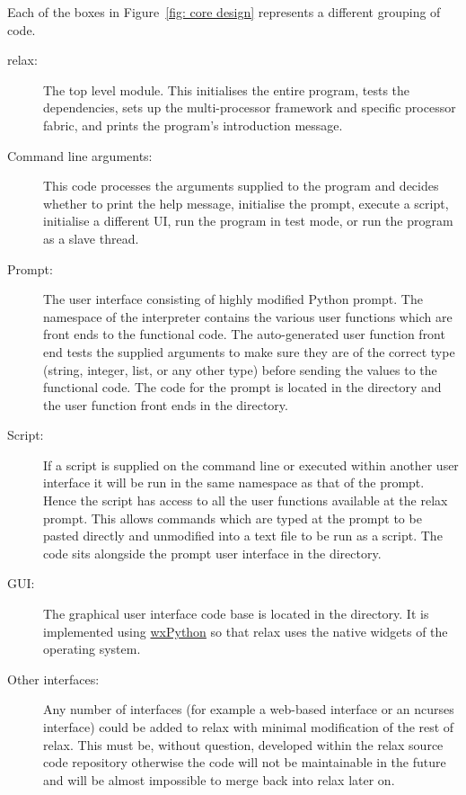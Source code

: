Each of the boxes in Figure~\ref{fig: core design} represents a different grouping of code.
\begin{description}
  \item[relax:]  The top level module.
    This initialises the entire program, tests the dependencies, sets up the multi-processor framework and specific processor fabric, and prints the program's introduction message.
  \item[Command line arguments:]  This code processes the arguments supplied to the program and decides whether to print the help message, initialise the prompt, execute a script, initialise a different UI, run the program in test mode, or run the program as a slave thread.
  \item[Prompt:]  The user interface consisting of highly modified Python prompt.
    The namespace of the interpreter contains the various user functions which are front ends to the functional code.
    The auto-generated user function front end tests the supplied arguments to make sure they are of the correct type (string, integer, list, or any other type) before sending the values to the functional code.
    The code for the prompt is located in the  directory and the user function front ends in the  directory.
  \item[Script:]  If a script is supplied on the command line or executed within another user interface it will be run in the same namespace as that of the prompt.
    Hence the script has access to all the user functions available at the relax prompt.
    This allows commands which are typed at the prompt to be pasted directly and unmodified into a text file to be run as a script.
    The code sits alongside the prompt user interface in the  directory.
  \item[GUI:]  The graphical user interface code base is located in the  directory.
    It is implemented using \href{https://wxpython.org/}{wxPython} so that relax uses the native widgets of the operating system.
  \item[Other interfaces:]  Any number of interfaces (for example a web-based interface or an ncurses interface) could be added to relax with minimal modification of the rest of relax.
    This must be, without question, developed within the relax source code repository otherwise the code will not be maintainable in the future and will be almost impossible to merge back into relax later on.

\end{description}
